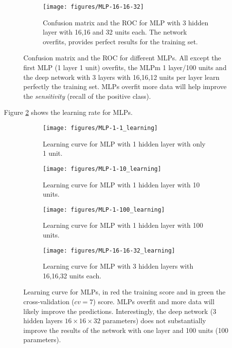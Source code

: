 \documentclass[11pt]{article}
\theoremstyle{definition}
\theoremstyle{remark}
\begin{document}
{\begin{figure}[H]
    \begin{subfigure}[t]{1\textwidth}
        \centering
        \texttt{[image: figures/MLP-16-16-32]}
        \caption{Confusion matrix and the ROC for MLP with 3 hidden layer with 16,16 and 32 units each. The network overfits, provides perfect results for the training set.}
    \end{subfigure}%
    
    \caption{Confusion matrix and the ROC for different MLPs. All except the first MLP (1 layer 1 unit) overfits, the MLPm 1 layer/100 units and the deep network with 3 layers with 16,16,12 units per layer learn perfectly the training set. MLPs overfit more data will help improve the \emph{sensitivity} (recall of the positive class).} \label{fig:mlp_cm}
\end{figure}


Figure \ref{fig:mlp_learning} shows the learning rate for MLPs.
\begin{figure}[H]
    \centering
    \begin{subfigure}[t]{1\textwidth}
        \centering
        \texttt{[image: figures/MLP-1-1\_learning]}
        \caption{Learning curve for MLP with 1 hidden layer with only 1 unit.}
    \end{subfigure}

    \begin{subfigure}[t]{1\textwidth}
        \centering
        \texttt{[image: figures/MLP-1-10\_learning]}
        \caption{Learning curve for MLP with 1 hidden layer with 10 units.}
    \end{subfigure}%

    \begin{subfigure}[t]{1\textwidth}
        \centering
        \texttt{[image: figures/MLP-1-100\_learning]}
        \caption{Learning curve for MLP with 1 hidden layer with 100 units.}
    \end{subfigure}%

    \begin{subfigure}[t]{1\textwidth}
        \centering
        \texttt{[image: figures/MLP-16-16-32\_learning]}
        \caption{Learning curve for MLP with 3 hidden layers with 16,16,32 units each.}
    \end{subfigure}%
    
    \caption{Learning curve for  MLPs, in red the training score and in green the cross-validation ($cv=7$) score. MLPs overfit and more data will likely improve the predictions. Interestingly, the deep network (3 hidden layers $16 \times 16 \times 32$ parameters) does not substantially improve the results of the network with one layer and 100 units (100 parameters).} \label{fig:mlp_learning}
\end{figure}


}
\end{document}
